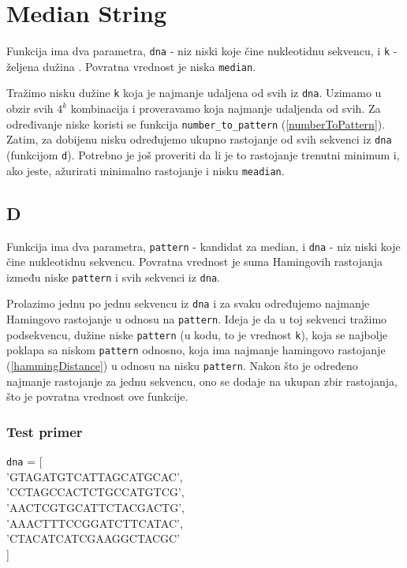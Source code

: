 \section{Median String}

Funkcija ima dva parametra, \texttt{dna} - niz niski koje čine nukleotidnu sekvencu, i \texttt{k} - željena dužina . Povratna vrednost je niska \texttt{median}.

Tražimo nisku dužine \texttt{k} koja je najmanje udaljena od svih iz \texttt{dna}. Uzimamo u obzir svih $4^k$ kombinacija i proveravamo koja najmanje udaljenda od svih. Za određivanje niske koristi se funkcija \texttt{number\_to\_pattern} (\ref{numberToPattern}). Zatim, za dobijenu nisku određujemo ukupno rastojanje od svih sekvenci iz \texttt{dna} (funkcijom \texttt{d}). Potrebno je još proveriti da li je to rastojanje trenutni minimum i, ako jeste, ažurirati minimalno rastojanje i nisku \texttt{meadian}.



\subsection{D}

Funkcija ima dva parametra, \texttt{pattern} - kandidat za median, i \texttt{dna} - niz niski koje čine nukleotidnu sekvencu. Povratna vrednost je suma Hamingovih rastojanja između niske \texttt{pattern} i svih sekvenci iz \texttt{dna}.

Prolazimo jednu po jednu sekvencu iz \texttt{dna} i za svaku određujemo najmanje Hamingovo rastojanje u odnosu na \texttt{pattern}. Ideja je da u toj sekvenci tražimo podsekvencu, dužine niske \texttt{pattern} (u kodu, to je vrednost \texttt{k}), koja se najbolje poklapa sa niskom \texttt{pattern} odnosno, koja ima najmanje hamingovo rastojanje (\ref{hammingDistance}) u odnosu na nisku \texttt{pattern}. Nakon što je određeno najmanje rastojanje za jednu sekvencu, ono se dodaje na ukupan zbir rastojanja, što je povratna vrednost ove funkcije.





\subsubsection{Test primer}
\noindent\texttt{dna} = [ \\
'GTAGATGTCATTAGCATGCAC', \\
'CCTAGCCACTCTGCCATGTCG', \\
'AACTCGTGCATTCTACGACTG', \\
'AAACTTTCCGGATCTTCATAC', \\
'CTACATCATCGAAGGCTACGC' \\
]

